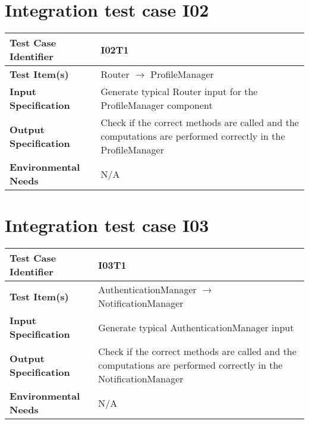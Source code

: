 \section{Integration test case I02}\label{I02}
\begin{center}
	\vspace{0.6cm}
	\begin{tabular}{|l|p{10cm}|}
		\hline
		\textbf{Test Case Identifier} & I02T1 \bigstrut \\\hline
		\textbf{Test Item(s)} & Router \ensuremath{\rightarrow} ProfileManager \bigstrut \\\hline
		\textbf{Input Specification} & Generate typical Router input for the ProfileManager component \bigstrut \\\hline
		\textbf{Output Specification} & Check if the correct methods are called and the computations are performed correctly in the ProfileManager \bigstrut \\\hline
		\textbf{Environmental Needs} & N/A \bigstrut \\\hline
	\end{tabular}
\end{center}

\section{Integration test case I03}\label{I03}
\begin{center}
	\vspace{0.6cm}
	\begin{tabular}{|l|p{10cm}|}
		\hline
		\textbf{Test Case Identifier} & I03T1 \bigstrut \\\hline
		\textbf{Test Item(s)} & AuthenticationManager \ensuremath{\rightarrow} NotificationManager \bigstrut \\\hline
		\textbf{Input Specification} & Generate typical AuthenticationManager input \bigstrut \\\hline
		\textbf{Output Specification} & Check if the correct methods are called and the computations are performed correctly in the NotificationManager \bigstrut \\\hline
		\textbf{Environmental Needs} & N/A \bigstrut \\\hline
	\end{tabular}
\end{center}

